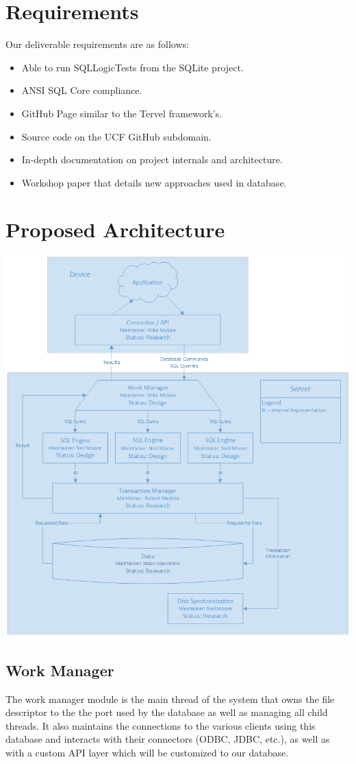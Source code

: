 \documentclass[letterpaper]{article}
\begin{document}
  \section{Requirements}
  Our deliverable requirements are as follows:
  \begin{itemize}
   \item Able to run SQLLogicTests from the SQLite project.
   \item ANSI SQL Core compliance.
   \item GitHub Page similar to the Tervel framework's.
   \item Source code on the UCF GitHub subdomain.
   \item In-depth documentation on project internals and architecture.
   \item Workshop paper that details new approaches used in database.
  \end{itemize}
  
  \section{Proposed Architecture}
  \centerline{\includegraphics[scale=.75]{OpenMemDbDiagram.png}}
  \subsection{Work Manager}
  The work manager module is the main thread of the system that owns the file descriptor to the the port used by the database as well as managing
  all child threads. It also maintains the connections to the various clients using this database and interacts with their connectors (ODBC, JDBC, etc.),
  as well as with a custom API layer which will be customized
   to our database.
  
\end{document}
